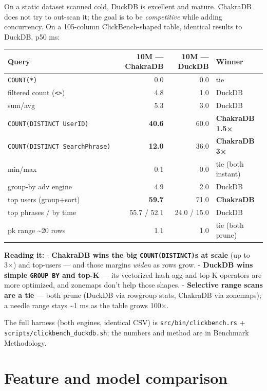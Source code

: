\documentclass[
  11pt,
  openany]{book}
\begin{document}
On a static dataset scanned cold, DuckDB is excellent and mature.
ChakraDB does not try to out-scan it; the goal is to be
\emph{competitive} while adding concurrency. On a 105-column
ClickBench-shaped table, identical results to DuckDB, p50 ms:

\begin{longtable}[]{@{}lrrl@{}}
\toprule\noalign{}
Query & 10M --- ChakraDB & 10M --- DuckDB & Winner \\
\midrule\noalign{}
\endhead
\bottomrule\noalign{}
\endlastfoot
\texttt{COUNT(*)} & 0.0 & 0.0 & tie \\
filtered count (\texttt{\textless{}\textgreater{}}) & 4.8 & 1.0 &
DuckDB \\
sum/avg & 5.3 & 3.0 & DuckDB \\
\texttt{COUNT(DISTINCT\ UserID)} & \textbf{40.6} & 60.0 &
\textbf{ChakraDB 1.5×} \\
\texttt{COUNT(DISTINCT\ SearchPhrase)} & \textbf{12.0} & 36.0 &
\textbf{ChakraDB 3×} \\
min/max & 0.1 & 0.0 & tie (both instant) \\
group-by adv engine & 4.9 & 2.0 & DuckDB \\
top users (group+sort) & \textbf{59.7} & 71.0 & \textbf{ChakraDB} \\
top phrases / by time & 55.7 / 52.1 & 24.0 / 15.0 & DuckDB \\
pk range \textasciitilde20 rows & 1.1 & 1.0 & tie (both prune) \\
\end{longtable}

\textbf{Reading it:} - \textbf{ChakraDB wins the big
\texttt{COUNT(DISTINCT)}s at scale} (up to 3×) and top-users --- and
those margins \emph{widen} as rows grow. - \textbf{DuckDB wins simple
\texttt{GROUP\ BY} and top-K} --- its vectorized hash-agg and top-K
operators are more optimized, and zonemaps don't help those shapes. -
\textbf{Selective range scans are a tie} --- both prune (DuckDB via
rowgroup stats, ChakraDB via zonemaps); a needle range stays
\textasciitilde1 ms as the table grows 100×.

The full harness (both engines, identical CSV) is
\texttt{src/bin/clickbench.rs} + \texttt{scripts/clickbench\_duckdb.sh};
the numbers and method are in Benchmark Methodology.

\section{Feature and model
comparison}\label{feature-and-model-comparison}
\end{document}
